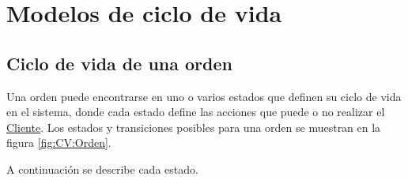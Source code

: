 
\section{Modelos de ciclo de vida}

	\hypertarget{CV:CuentaSolicitante}{}
	\subsection{Ciclo de vida de una orden}

		Una orden puede encontrarse en uno o varios estados que definen su ciclo de vida en el sistema, donde cada estado define las acciones que puede o no realizar el \hyperlink{A:Cliente}{Cliente}. Los estados y transiciones posibles para una orden se muestran en la figura \ref{fig:CV:Orden}.
	
		A continuación se describe cada estado.

